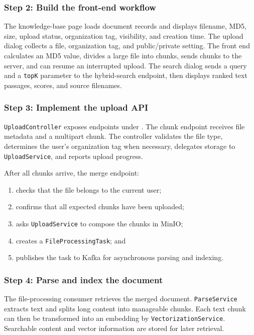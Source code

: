 \documentclass[11pt,a4paper]{article}
\begin{document}
\subsubsection{Step 2: Build the front-end workflow}

The knowledge-base page loads document records and displays filename, MD5, size,
upload status, organization tag, visibility, and creation time. The upload dialog
collects a file, organization tag, and public/private setting. The front end calculates
an MD5 value, divides a large file into chunks, sends chunks to the server, and can
resume an interrupted upload. The search dialog sends a query and a \texttt{topK}
parameter to the hybrid-search endpoint, then displays ranked text passages, scores,
and source filenames.

\subsubsection{Step 3: Implement the upload API}

\texttt{UploadController} exposes endpoints under . The chunk
endpoint receives file metadata and a multipart chunk. The controller validates the
file type, determines the user's organization tag when necessary, delegates storage to
\texttt{UploadService}, and reports upload progress.

After all chunks arrive, the merge endpoint:
\begin{enumerate}[leftmargin=2em]
  \item checks that the file belongs to the current user;
  \item confirms that all expected chunks have been uploaded;
  \item asks \texttt{UploadService} to compose the chunks in MinIO;
  \item creates a \texttt{FileProcessingTask}; and
  \item publishes the task to Kafka for asynchronous parsing and indexing.
\end{enumerate}

\subsubsection{Step 4: Parse and index the document}

The file-processing consumer retrieves the merged document. \texttt{ParseService}
extracts text and splits long content into manageable chunks. Each text chunk can then
be transformed into an embedding by \texttt{VectorizationService}. Searchable content
and vector information are stored for later retrieval.
\end{document}
